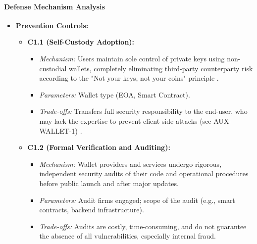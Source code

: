 \paragraph{Defense Mechanism Analysis}
\begin{itemize}
    \item \textbf{Prevention Controls:}
        \begin{itemize}
            \item \textbf{C1.1 (Self-Custody Adoption):}
                \begin{itemize}
                    \item \textit{Mechanism:} Users maintain sole control of private keys using non-custodial wallets, completely eliminating third-party counterparty risk according to the "Not your keys, not your coins" principle \cite{yu2024}.
                    \item \textit{Parameters:} Wallet type (EOA, Smart Contract).
                    \item \textit{Trade-offs:} Transfers full security responsibility to the end-user, who may lack the expertise to prevent client-side attacks (see AUX-WALLET-1) \cite{yu2024, houy2023}.
                \end{itemize}
            \item \textbf{C1.2 (Formal Verification and Auditing):}
                \begin{itemize}
                    \item \textit{Mechanism:} Wallet providers and services undergo rigorous, independent security audits of their code and operational procedures before public launch and after major updates\cite{durieux2020empirical}.
                    \item \textit{Parameters:} Audit firms engaged; scope of the audit (e.g., smart contracts, backend infrastructure).
                    \item \textit{Trade-offs:} Audits are costly, time-consuming, and do not guarantee the absence of all vulnerabilities, especially internal fraud.
                \end{itemize}
        \end{itemize}


\end{itemize}

